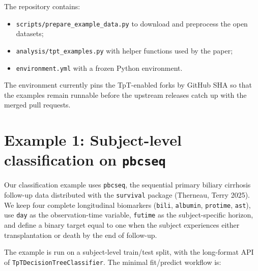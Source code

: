 \documentclass[
  letterpaper,
  DIV=11,
  numbers=noendperiod]{scrartcl}
\providecommand{\tightlist}{%
  \setlength{\itemsep}{0pt}\setlength{\parskip}{0pt}}
\begin{document}
The repository contains:

\begin{itemize}
\tightlist
\item
  \texttt{scripts/prepare\_example\_data.py} to download and preprocess
  the open datasets;
\item
  \texttt{analysis/tpt\_examples.py} with helper functions used by the
  paper;
\item
  \texttt{environment.yml} with a frozen Python environment.
\end{itemize}

The environment currently pins the TpT-enabled forks by GitHub SHA so
that the examples remain runnable before the upstream releases catch up
with the merged pull requests.

\section{\texorpdfstring{Example 1: Subject-level classification on
\texttt{pbcseq}}{Example 1: Subject-level classification on pbcseq}}\label{example-1-subject-level-classification-on-pbcseq}

Our classification example uses \texttt{pbcseq}, the sequential primary
biliary cirrhosis follow-up data distributed with the \texttt{survival}
package (Therneau, Terry 2025). We keep four complete longitudinal
biomarkers (\texttt{bili}, \texttt{albumin}, \texttt{protime},
\texttt{ast}), use \texttt{day} as the observation-time variable,
\texttt{futime} as the subject-specific horizon, and define a binary
target equal to one when the subject experiences either transplantation
or death by the end of follow-up.

The example is run on a subject-level train/test split, with the
long-format API of \texttt{TpTDecisionTreeClassifier}. The minimal
fit/predict workflow is:
\end{document}
